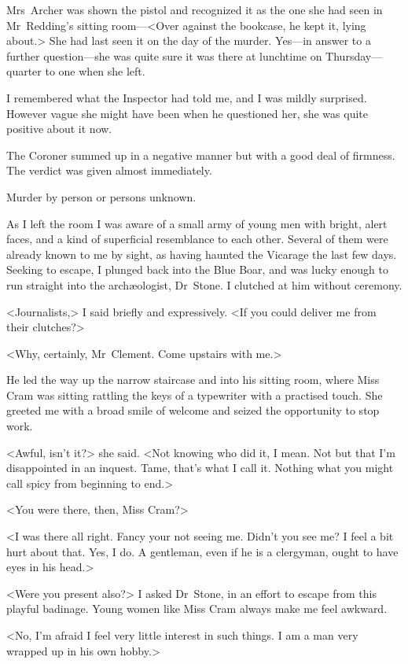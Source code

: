 Mrs~Archer was shown the pistol and recognized it as the one she had seen in Mr~Redding's sitting room—<Over against the bookcase, he kept it, lying about.> She had last seen it on the day of the murder. Yes—in answer to a further question—she was quite sure it was there at lunchtime on Thursday—quarter to one when she left.

I remembered what the Inspector had told me, and I was mildly surprised. However vague she might have been when he questioned her, she was quite positive about it now.

The Coroner summed up in a negative manner but with a good deal of firmness. The verdict was given almost immediately.

Murder by person or persons unknown.

As I left the room I was aware of a small army of young men with bright, alert faces, and a kind of superficial resemblance to each other. Several of them were already known to me by sight, as having haunted the Vicarage the last few days. Seeking to escape, I plunged back into the Blue Boar, and was lucky enough to run straight into the archæologist, Dr~Stone. I clutched at him without ceremony.

<Journalists,> I said briefly and expressively. <If you could deliver me from their clutches?>

<Why, certainly, Mr~Clement. Come upstairs with me.>

He led the way up the narrow staircase and into his sitting room, where Miss Cram was sitting rattling the keys of a typewriter with a practised touch. She greeted me with a broad smile of welcome and seized the opportunity to stop work.

<Awful, isn't it?> she said. <Not knowing who did it, I mean. Not but that I'm disappointed in an inquest. Tame, that's what I call it. Nothing what you might call spicy from beginning to end.>

<You were there, then, Miss Cram?>

<I was there all right. Fancy your not seeing me. Didn't you see me? I feel a bit hurt about that. Yes, I do. A gentleman, even if he is a clergyman, ought to have eyes in his head.>

<Were you present also?> I asked Dr~Stone, in an effort to escape from this playful badinage. Young women like Miss Cram always make me feel awkward.

<No, I'm afraid I feel very little interest in such things. I am a man very wrapped up in his own hobby.>

